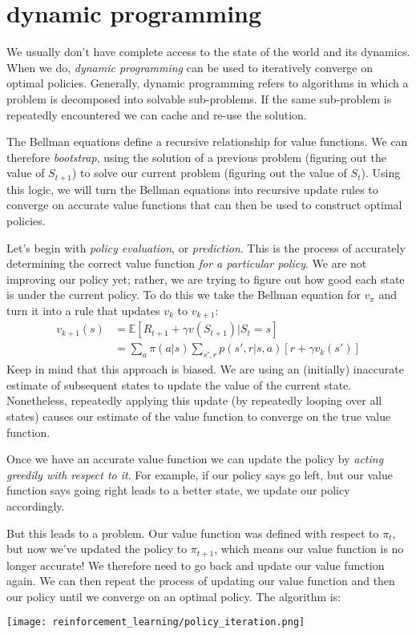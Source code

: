\section{dynamic programming}
We usually don't have complete access to the state of the world and its dynamics. When we do, \textit{dynamic programming} can be used to iteratively converge on optimal policies. Generally, dynamic programming refers to algorithms in which a problem is decomposed into solvable sub-problems. If the same sub-problem is repeatedly encountered we can cache and re-use the solution.

The Bellman equations define a recursive relationship for value functions. We can therefore \textit{bootstrap}, using the solution of a previous problem (figuring out the value of $S_{t+1}$) to solve our current problem (figuring out the value of $S_{t}$). Using this logic, we will turn the Bellman equations into recursive update rules to converge on accurate value functions that can then be used to construct optimal policies.

Let's begin with \textit{policy evaluation}, or \textit{prediction}. This is the process of accurately determining the correct value function \textit{for a particular policy}. We are not improving our policy yet; rather, we are trying to figure out how good each state is under the current policy. To do this we take the Bellman equation for $v_\pi$ and turn it into a rule that updates $v_k$ to $v_{k+1}$:
\begin{align*}
v_{k+1}(s) &= \mathbb{E}[R_{t+1} + \gamma v(S_{t+1}) | S_t = s] \\
&= \sum_a \pi(a|s) \sum_{s',r} p(s',r|s,a) [r + \gamma v_k(s')]
\end{align*}
Keep in mind that this approach is biased. We are using an (initially) inaccurate estimate of subsequent states to update the value of the current state. Nonetheless, repeatedly applying this update (by repeatedly looping over all states) causes our estimate of the value function to converge on the true value function. 

Once we have an accurate value function we can update the policy by \textit{acting greedily with respect to it}. For example, if our policy says go left, but our value function says going right leads to a better state, we update our policy accordingly. 

But this leads to a problem. Our value function was defined with respect to $\pi_t$, but now we've updated the policy to $\pi_{t+1}$, which means our value function is no longer accurate! We therefore need to go back and update our value function again. We can then repeat the process of updating our value function and then our policy until we converge on an optimal policy. The algorithm is:
\begin{center}\texttt{[image: reinforcement\_learning/policy\_iteration.png]}\end{center}

